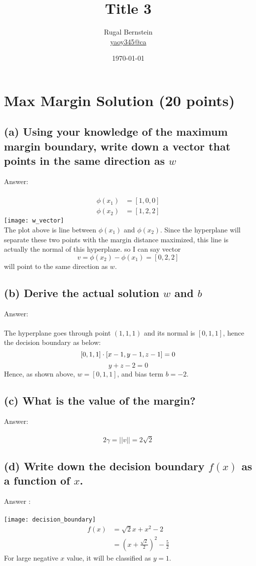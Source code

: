\documentclass[12pt]{article}
\title{Title 3}
\author{Rugal Bernstein\\ \href{mailto:yaoy@cs}{yaoy345@ca}}
\date{\today}
\begin{document}
\maketitle
\thispagestyle{empty}

\section{Max Margin Solution (20 points)}
\subsection*{(a) Using your knowledge of the maximum margin boundary, write down a vector that points in the same direction as $w$}
Answer:\\\\
$$
\begin{aligned}
\phi(x_1) &= [1,0,0]\\
\phi(x_2) &= [1,2,2]
\end{aligned}
$$
\texttt{[image: w\_vector]}\\ 
The plot above is line between $\phi(x_1)$ and $\phi(x_2)$. Since the hyperplane will separate these two points with the margin distance maximized, this line is actually the normal of this hyperplane. so I can say vector $$v=\phi(x_2) - \phi(x_1)=[0,2,2]$$ will point to the same direction as $w$.\\ 

\subsection*{(b) Derive the actual solution $w$ and $b$	}
Answer:\\\\
The hyperplane goes through point $(1,1,1)$ and its normal is $[0,1,1]$, hence the decision boundary as below:\\
$$
[0,1,1] \cdot [x-1, y-1,z-1]=0\\
$$
$$
y+z-2=0
$$
Hence, as shown above, $w=[0,1,1]$, and bias term $b=-2$.
\subsection*{(c) What is the value of the margin?}
Answer:\\\\
$$
2\gamma = ||v|| = 2\sqrt{2}
$$
\subsection*{(d) Write down the decision boundary $f(x)$ as a function of $x$.}
Answer :\\\\
\texttt{[image: decision\_boundary]}\\ 
$$
\begin{aligned}
f(x)&=\sqrt{2}x+x^2-2\\
&=\left(x+\frac{\sqrt{2}}{2}\right)^2-\frac{5}{2}
\end{aligned}
$$
For large negative $x$ value, it will be classified as $y=1$.\\\\
\end{document}
